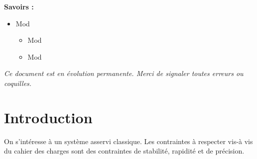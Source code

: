 \documentclass[10pt,oneside]{article}
\begin{document}
\begin{savoir}
\textbf{Savoirs :}
\begin{itemize}
\item Mod%
\begin{itemize}
\item Mod%
\item Mod%
\end{itemize}
\end{itemize}
\end{savoir}

\setlength{\parskip}{0ex plus 0.2ex minus 0ex}
 \renewcommand{\contentsname}{}
 \renewcommand{\baselinestretch}{1}

\textit{Ce document est en évolution permanente. Merci de signaler toutes
erreurs ou coquilles.}

\tableofcontents

 \renewcommand{\baselinestretch}{1.2}
\setlength{\parskip}{2ex plus 0.5ex minus 0.2ex}

\section{Introduction}


On s'intéresse à un système asservi classique. Les contraintes à respecter vis-à vis du cahier des charges sont des contraintes de stabilité, rapidité et de précision.
\end{document}
